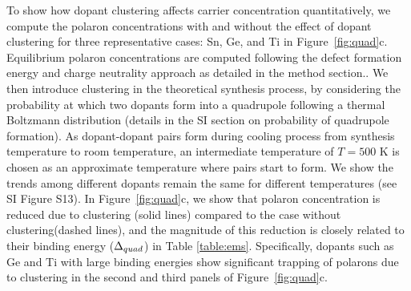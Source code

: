 To show how dopant clustering affects carrier concentration quantitatively, we compute the polaron concentrations with and without the effect of dopant clustering for three representative cases: Sn, Ge, and Ti in Figure~\ref{fig:quad}c.
Equilibrium polaron concentrations are computed following the defect formation energy and charge neutrality approach as detailed in the method section.\cite{lee2013thermodynamics,freysoldt2014first}.
We then introduce clustering in the theoretical synthesis process, by considering the probability at which two dopants form into a quadrupole following a thermal Boltzmann distribution (details in the SI section on probability of quadrupole formation).
As dopant-dopant pairs form during cooling process from synthesis temperature to room temperature, an intermediate temperature of $T=500$ K is chosen as an approximate temperature where pairs start to form. We show the trends among different dopants remain the same for different temperatures (see SI Figure S13).
In Figure~\ref{fig:quad}c, we show that
polaron concentration is reduced due to clustering (solid lines) compared to the case without clustering(dashed lines), and the magnitude of this reduction is closely related to their binding energy ($\Delta_{quad}$) in Table \ref{table:ems}. Specifically, dopants such as Ge and Ti with large binding energies show significant trapping of polarons due to clustering in the second and third panels of Figure~\ref{fig:quad}c. %

